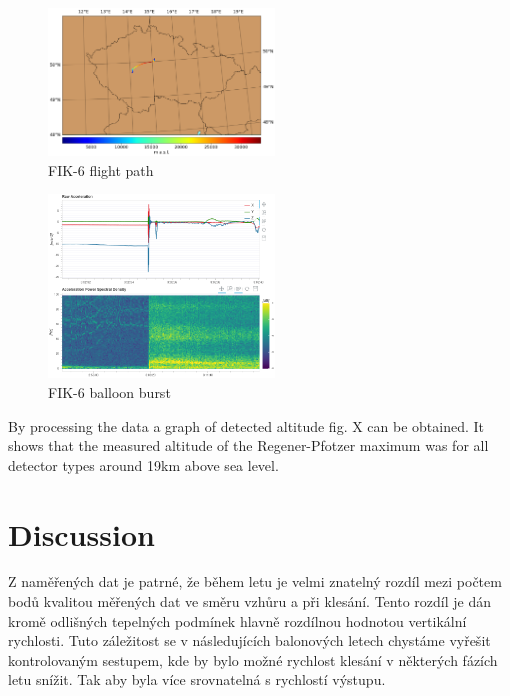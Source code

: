 \documentclass{Rpd}
\begin{document}
\begin{center}
\begin{figure}%
	\centerline{\includegraphics[width=60mm]{img/FIK-6_flight_path.png}}
	\caption{FIK-6 flight path \label{FIK-6_flight_path}}
\end{figure}
\end{center}

\begin{center}
\begin{figure}%
	\centerline{\includegraphics[width=60mm]{img/FIK-6_balloon_burst.png}}
	\caption{FIK-6 balloon burst \label{FIK-6_balloon_burst}}
\end{figure}
\end{center}

By processing the data a graph of detected altitude fig. X can be obtained. It shows that the measured altitude of the Regener-Pfotzer maximum was for all detector types around 19km above sea level.

\section{Discussion}


Z naměřených dat je patrné, že během letu je velmi znatelný rozdíl mezi počtem bodů kvalitou měřených dat ve směru vzhůru a při klesání. Tento rozdíl je dán kromě odlišných tepelných podmínek hlavně rozdílnou hodnotou vertikální rychlosti.  Tuto záležitost se v následujících balonových letech chystáme vyřešit kontrolovaným sestupem, kde by bylo možné rychlost klesání v některých fázích letu snížit. Tak aby byla více srovnatelná s rychlostí výstupu.
\end{document}
